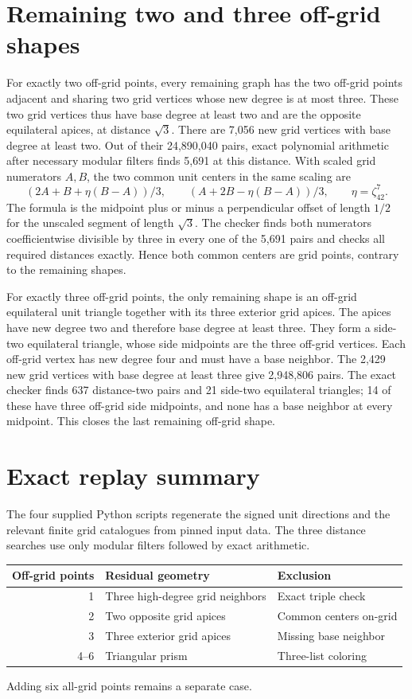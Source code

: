 \documentclass[11pt,letterpaper]{article}
\begin{document}
\section{Remaining two and three off-grid
shapes}\label{remaining-two-and-three-off-grid-shapes}

For exactly two off-grid points, every remaining graph has the two
off-grid points adjacent and sharing two grid vertices whose new degree
is at most three. These two grid vertices thus have base degree at least
two and are the opposite equilateral apices, at distance \(\sqrt3\).
There are 7,056 new grid vertices with base degree at least two. Out of
their 24,890,040 pairs, exact polynomial arithmetic after necessary
modular filters finds 5,691 at this distance. With scaled grid
numerators \(A,B\), the two common unit centers in the same scaling are
\[
(2A+B+\eta(B-A))/3,\qquad (A+2B-\eta(B-A))/3,
\qquad \eta=\zeta_{42}^7.
\] The formula is the midpoint plus or minus a perpendicular offset of
length \(1/2\) for the unscaled segment of length \(\sqrt3\). The
checker finds both numerators coefficientwise divisible by three in
every one of the 5,691 pairs and checks all required distances exactly.
Hence both common centers are grid points, contrary to the remaining
shapes.

For exactly three off-grid points, the only remaining shape is an
off-grid equilateral unit triangle together with its three exterior grid
apices. The apices have new degree two and therefore base degree at
least three. They form a side-two equilateral triangle, whose side
midpoints are the three off-grid vertices. Each off-grid vertex has new
degree four and must have a base neighbor. The 2,429 new grid vertices
with base degree at least three give 2,948,806 pairs. The exact checker
finds 637 distance-two pairs and 21 side-two equilateral triangles; 14
of these have three off-grid side midpoints, and none has a base
neighbor at every midpoint. This closes the last remaining off-grid
shape.


\section{Exact replay summary}
The four supplied Python scripts regenerate the signed unit directions and
the relevant finite grid catalogues from pinned input data. The three
distance searches use only modular filters followed by exact arithmetic.
\begin{center}
\small
\begin{tabular}{r l l}
\textbf{Off-grid points} & \textbf{Residual geometry} & \textbf{Exclusion}\\\hline
1 & Three high-degree grid neighbors & Exact triple check\\
2 & Two opposite grid apices & Common centers on-grid\\
3 & Three exterior grid apices & Missing base neighbor\\
4--6 & Triangular prism & Three-list coloring
\end{tabular}
\end{center}
Adding six all-grid points remains a separate case.
\end{document}
